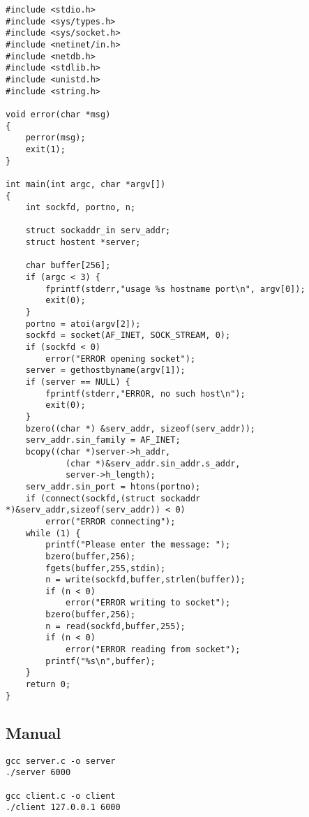 \documentclass[12pt]{article}
\begin{document}
\begin{lstlisting}
#include <stdio.h>
#include <sys/types.h>
#include <sys/socket.h>
#include <netinet/in.h>
#include <netdb.h> 
#include <stdlib.h>
#include <unistd.h>
#include <string.h>

void error(char *msg)
{
	perror(msg);
	exit(1);
}

int main(int argc, char *argv[])
{
	int sockfd, portno, n;

	struct sockaddr_in serv_addr;
	struct hostent *server;

	char buffer[256];
	if (argc < 3) {
		fprintf(stderr,"usage %s hostname port\n", argv[0]);
		exit(0);
	}
	portno = atoi(argv[2]);
	sockfd = socket(AF_INET, SOCK_STREAM, 0);
	if (sockfd < 0) 
		error("ERROR opening socket");
	server = gethostbyname(argv[1]);
	if (server == NULL) {
		fprintf(stderr,"ERROR, no such host\n");
		exit(0);
	}
	bzero((char *) &serv_addr, sizeof(serv_addr));
	serv_addr.sin_family = AF_INET;
	bcopy((char *)server->h_addr, 
			(char *)&serv_addr.sin_addr.s_addr,
			server->h_length);
	serv_addr.sin_port = htons(portno);
	if (connect(sockfd,(struct sockaddr *)&serv_addr,sizeof(serv_addr)) < 0) 
		error("ERROR connecting");
	while (1) {
		printf("Please enter the message: ");
		bzero(buffer,256);
		fgets(buffer,255,stdin);
		n = write(sockfd,buffer,strlen(buffer));
		if (n < 0) 
			error("ERROR writing to socket");
		bzero(buffer,256);
		n = read(sockfd,buffer,255);
		if (n < 0) 
			error("ERROR reading from socket");
		printf("%s\n",buffer);
	}
	return 0;
}
\end{lstlisting}

\subsection{Manual}

\begin{lstlisting}
gcc server.c -o server
./server 6000

gcc client.c -o client
./client 127.0.0.1 6000
\end{lstlisting}



\end{document}
